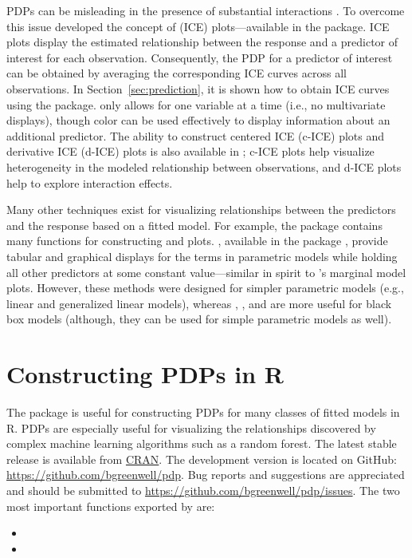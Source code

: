 PDPs can be misleading in the presence of substantial interactions \citep{goldstein-peeking-2015}. To overcome this issue \citeauthor*{goldstein-peeking-2015} developed the concept of  (ICE) plots---available in the  package. ICE plots display the estimated relationship between the response and a predictor of interest for each observation. Consequently, the PDP for a predictor of interest can be obtained by averaging the corresponding ICE curves across all observations. In Section~\ref{sec:prediction}, it is shown how to obtain ICE curves using the  package.  only allows for one variable at a time (i.e., no multivariate displays), though color can be used effectively to display information about an additional predictor. The ability to construct centered ICE (c-ICE) plots and derivative ICE (d-ICE) plots is also available in ; c-ICE plots help visualize heterogeneity in the modeled relationship between observations, and d-ICE plots help to explore interaction effects.

Many other techniques exist for visualizing relationships between the predictors and the response based on a fitted model. For example, the  package \citep{fox-car-2011} contains many functions for constructing  and  plots. , available in the  package \citep{fox-effects-2003}, provide tabular and graphical displays for the terms in parametric models while holding all other predictors at some constant value---similar in spirit to 's marginal model plots. However, these methods were designed for simpler parametric models (e.g., linear and generalized linear models), whereas , , and  are more useful for black box models (although, they can be used for simple parametric models as well).


\section{Constructing PDPs in R}
\label{sec:boston}

The  package is useful for constructing PDPs for many classes of fitted models in R. PDPs are especially useful for visualizing the relationships discovered by complex machine learning algorithms such as a random forest. The latest stable release is available from \href{https://cran.r-project.org/package=pdp}{CRAN}. The development version is located on GitHub: \url{https://github.com/bgreenwell/pdp}. Bug reports and suggestions are appreciated and should be submitted to \url{https://github.com/bgreenwell/pdp/issues}. The two most important functions exported by  are:
\begin{itemize}
  \item {}
  \item {}
\end{itemize}


